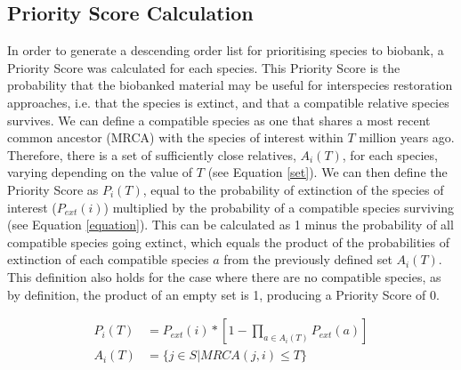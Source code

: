 \documentclass[12pt]{article}
\begin{document}
	\subsection{Priority Score Calculation}\label{ps_method}
	In order to generate a descending order list for prioritising species to biobank,
	a Priority Score was calculated for each species. This Priority Score is the probability
	that the biobanked material may be useful for interspecies restoration approaches, i.e.
	that the species is extinct, and that a compatible relative species survives.
	We can define a compatible species as one that shares a most recent common
	ancestor (MRCA) with the species of interest within $T$ million years ago.
	Therefore, there is a set of sufficiently close relatives, $A_i(T)$,
	for each species, varying depending on the value of $T$ (see
	Equation \ref{set}). We can then define the Priority Score as $P_i(T)$, equal
	to the probability of extinction of the species of interest ($P_{ext}(i)$) multiplied by
	the probability of a compatible species surviving (see Equation \ref{equation}). 
	This can be calculated as 1 minus
	the probability of all compatible species going extinct,
	which equals the product of the probabilities
	of extinction of each compatible species $a$ from the previously defined set $A_i(T)$.
	This definition also holds for the case where there are no compatible species, as by definition, the product of an empty set is 1, producing a Priority Score of 0.
	
	\begin{align}
		P_i(T) &= P_{ext}(i) * [1 - \prod_{a \in A_i(T)} P_{ext}(a)] \label{equation}\\
		A_i(T) &= \{j \in S | MRCA(j, i) \le T\} \label{set}
	\end{align}
\end{document}
